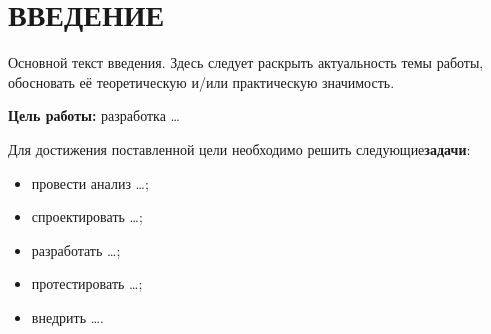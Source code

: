 \section*{\MakeTextUppercase{Введение}}

Основной текст введения. Здесь следует раскрыть актуальность темы работы, обосновать её теоретическую и/или практическую значимость.

\textbf{Цель работы:} разработка \ldots

Для достижения поставленной цели необходимо решить следующие\linebreak \textbf{задачи}:

\begin{itemize}[label=--]
	\item провести анализ \ldots;
	\item спроектировать \ldots;
	\item разработать \ldots;
	\item протестировать \ldots;
	\item внедрить \ldots.
\end{itemize}